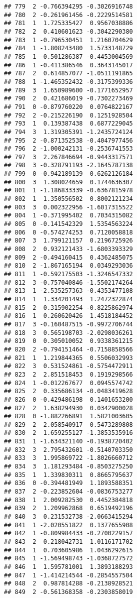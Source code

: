 \documentclass[
]{article}
\begin{document}
\begin{verbatim}
## 779  2 -0.766394295 -0.3026916748
## 780  2 -0.261961456 -0.2229514581
## 781  1  1.725335427  0.9567038886
## 782  2  0.410601623 -0.3042290380
## 783  1 -0.796530451  1.2160704629
## 784  1 -1.808243480  1.5733148729
## 785  1 -0.501286387 -0.4453004569
## 786  1 -0.411386546  0.3643145017
## 787  2  0.614857077 -1.0511191865
## 788  1 -1.465352432 -0.3175399336
## 789  3  1.650989600 -0.1771652957
## 790  2  0.421686019 -0.7302273469
## 791  0 -0.879760220  0.0764822167
## 792  2 -0.215226190  0.1251928504
## 793  1  0.139387438  0.6877229045
## 794  3  1.319305391 -1.2435724124
## 795  2 -0.871352538 -0.4047977456
## 796  2 -1.000242131 -0.2536741553
## 797  3  2.267846694 -0.9443317571
## 798  3 -0.328791193 -2.1645787138
## 799  0 -0.942189139  0.6262126184
## 800  3  1.308024659  0.1744636307
## 801  1 -1.186833339 -0.6367815978
## 802  1  1.350556502  0.8002121234
## 803  3  0.002322956 -1.6017315522
## 804  1 -0.371995402  0.7034315082
## 805  0 -0.141542329  1.5354563224
## 806  0 -0.574274253  0.7120058818
## 807  3  1.799121157  0.2196725926
## 808  2  0.932121433 -1.6803393329
## 809  2 -0.494160415  0.4362485075
## 810  2 -1.867165194  0.0349293036
## 811  1 -0.592175503 -1.3246547332
## 812  3 -0.757040846 -1.5502174264
## 813  1 -2.535257363 -0.4353477108
## 814  1  1.334201493  1.2472322874
## 815  2  0.315902254 -0.8225862974
## 816  1  0.260620426  1.4518184452
## 817  3 -0.160487515 -0.9972706744
## 818  3  0.565198703 -2.0298036261
## 819  0  0.305010052  0.9338361215
## 820  2 -0.794151464 -0.7158858566
## 821  1  1.219844365  0.5506032993
## 822  3  0.531524861 -0.5754472911
## 823  2  2.851518453  0.1919298566
## 824  1 -0.012267677  0.0945574742
## 825  2  0.335686134 -0.0483419628
## 826  0 -0.429486198  0.1401653200
## 827  2  1.638294930  0.0342900028
## 828  0 -1.882266891  1.5821003605
## 829  2  2.058540917  0.5473289808
## 830  2  1.659255127 -1.3853535916
## 831  1 -1.634321140 -0.1938720402
## 832  3  2.795432601 -0.5140703350
## 833  3  1.995869722 -1.8026660712
## 834  3  1.181293484 -0.8503275250
## 835  1  1.339830311  0.8665795637
## 836  0 -0.394481949  1.1893588351
## 837  2 -0.223852604 -0.0836753277
## 838  1  2.009282530  0.4452384818
## 839  2  1.209962868  0.6519492196
## 840  3  0.231532738 -2.0663415294
## 841  1 -2.020551822  0.1377655908
## 842  1 -0.809984433 -0.2700229157
## 843  2  0.218042731  1.0116171702
## 844  1  0.703605986  1.0436292615
## 845  1 -1.569498743 -1.0368727572
## 846  1  1.595781001  1.3893188293
## 847  1 -1.414214544 -0.2854557504
## 848  2  0.987814288 -0.2138928521
## 849  2 -0.561368358 -0.2303858019

\end{verbatim}
\end{document}
